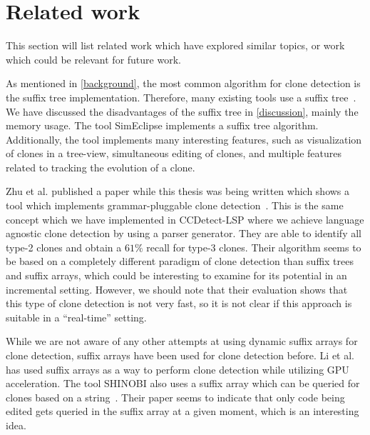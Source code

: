 \section{Related work}

This section will list related work which have explored similar topics, or work which
could be relevant for future work.

As mentioned in \cref{background}, the most common algorithm for clone detection is the
suffix tree implementation. Therefore, many existing tools use a suffix
tree~\cite{GodeIncrementalCloneDetection, Zibran_real_time_search}. We have discussed the
disadvantages of the suffix tree in \cref{discussion}, mainly the memory usage. The tool
SimEclipse implements a suffix tree algorithm. Additionally, the tool implements many
interesting features, such as visualization of clones in a tree-view, simultaneous editing
of clones, and multiple features related to tracking the evolution of a clone.

Zhu et al. published a paper while this thesis was being written which shows a tool which
implements grammar-pluggable clone detection~\cite{GrammarPluggableCloneDetection}. This
is the same concept which we have implemented in CCDetect-LSP where we achieve language
agnostic clone detection by using a parser generator. They are able to identify all type-2
clones and obtain a $61\%$ recall for type-3 clones. Their algorithm seems to be based on
a completely different paradigm of clone detection than suffix trees and suffix arrays,
which could be interesting to examine for its potential in an incremental setting.
However, we should note that their evaluation shows that this type of clone detection is
not very fast, so it is not clear if this approach is suitable in a ``real-time'' setting.

While we are not aware of any other attempts at using dynamic suffix arrays for clone
detection, suffix arrays have been used for clone detection before. Li et al.~\cite{SAGA}
has used suffix arrays as a way to perform clone detection while utilizing GPU
acceleration. The tool SHINOBI also uses a suffix array which can be queried for clones
based on a string~\cite{SHINOBI}. Their paper seems to indicate that only code being
edited gets queried in the suffix array at a given moment, which is an interesting idea.

